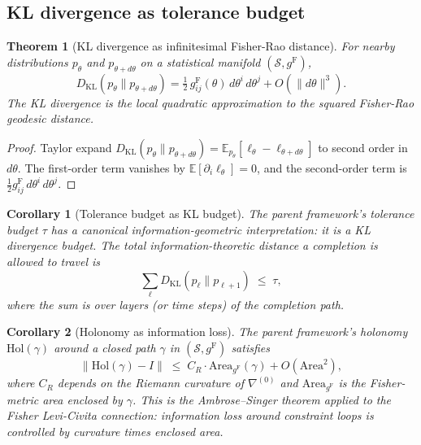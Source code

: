 \documentclass[11pt]{article}
\newcommand{\E}{\mathbb{E}}
\newcommand{\norm}[1]{\left\lVert #1 \right\rVert}
\newcommand{\gF}{g^{\mathrm{F}}}
\newcommand{\DKL}{D_{\mathrm{KL}}}
\newtheorem{theorem}{Theorem}
\newtheorem{corollary}{Corollary}
\theoremstyle{remark}
\begin{document}
\subsection{KL divergence as tolerance budget}

\begin{theorem}[KL divergence as infinitesimal Fisher-Rao distance]
\label{thm:kl-fisher}
For nearby distributions $p_\theta$ and $p_{\theta + d\theta}$ on a
statistical manifold $(\mathcal{S}, \gF)$,
\begin{equation}\label{eq:kl-fisher}
\DKL(p_\theta \| p_{\theta + d\theta})
= \tfrac{1}{2}\, \gF_{ij}(\theta)\, d\theta^i\, d\theta^j
+ O(\|d\theta\|^3).
\end{equation}
The KL divergence is the local quadratic approximation to the squared
Fisher-Rao geodesic distance.
\end{theorem}

\begin{proof}
Taylor expand $\DKL(p_\theta \| p_{\theta + d\theta})
= \E_{p_\theta}[\ell_\theta - \ell_{\theta + d\theta}]$
to second order in $d\theta$.  The first-order term vanishes by
$\E[\partial_i \ell_\theta] = 0$, and the second-order term is
$\tfrac{1}{2} \gF_{ij}\, d\theta^i\, d\theta^j$.
\end{proof}

\begin{corollary}[Tolerance budget as KL budget]\label{cor:tolerance-kl}
The parent framework's tolerance budget $\tau$ has a canonical
information-geometric interpretation: it is a KL divergence budget.  The
total information-theoretic distance a completion is allowed to travel is
\[
\sum_{\ell} \DKL(p_{\ell} \| p_{\ell+1}) \;\le\; \tau,
\]
where the sum is over layers (or time steps) of the completion path.
\end{corollary}

\begin{corollary}[Holonomy as information loss]\label{cor:holonomy-kl}
The parent framework's holonomy $\mathrm{Hol}(\gamma)$ around a closed path
$\gamma$ in $(\mathcal{S}, \gF)$ satisfies
\begin{equation}\label{eq:holonomy-area}
\norm{\mathrm{Hol}(\gamma) - I}
\;\le\;
C_R \cdot \mathrm{Area}_{\gF}(\gamma) + O(\mathrm{Area}^2),
\end{equation}
where $C_R$ depends on the Riemann curvature of $\nabla^{(0)}$ and
$\mathrm{Area}_{\gF}$ is the Fisher-metric area enclosed by $\gamma$.  This
is the Ambrose--Singer theorem applied to the Fisher Levi-Civita connection:
information loss around constraint loops is controlled by curvature times
enclosed area.
\end{corollary}
\end{document}
